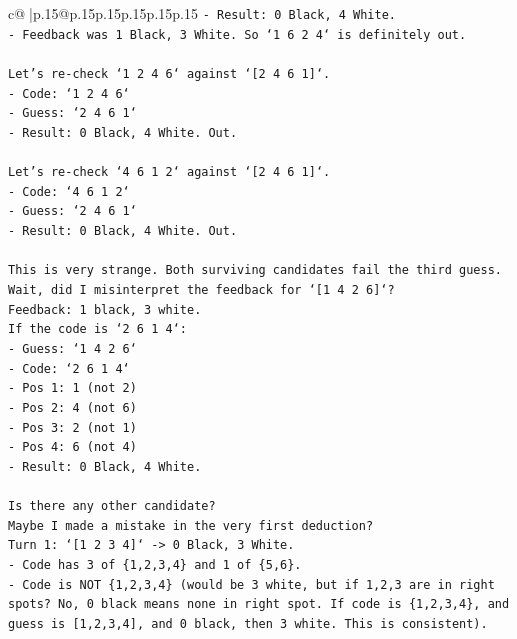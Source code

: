 \documentclass{article}
\begin{document}
{\begin{supertabular}{c@{$\;$}|p{.15\linewidth}@{}p{.15\linewidth}p{.15\linewidth}p{.15\linewidth}p{.15\linewidth}p{.15\linewidth}}
{{{\texttt{{-} Result: 0 Black, 4 White.} \\
\texttt{{-} Feedback was 1 Black, 3 White. So `1 6 2 4` is definitely out.} \\
\\ 
\texttt{Let's re{-}check `1 2 4 6` against `{[}2 4 6 1{]}`.} \\
\texttt{{-} Code: `1 2 4 6`} \\
\texttt{{-} Guess: `2 4 6 1`} \\
\texttt{{-} Result: 0 Black, 4 White. Out.} \\
\\ 
\texttt{Let's re{-}check `4 6 1 2` against `{[}2 4 6 1{]}`.} \\
\texttt{{-} Code: `4 6 1 2`} \\
\texttt{{-} Guess: `2 4 6 1`} \\
\texttt{{-} Result: 0 Black, 4 White. Out.} \\
\\ 
\texttt{This is very strange. Both surviving candidates fail the third guess.} \\
\texttt{Wait, did I misinterpret the feedback for `{[}1 4 2 6{]}`?} \\
\texttt{Feedback: 1 black, 3 white.} \\
\texttt{If the code is `2 6 1 4`:} \\
\texttt{{-} Guess: `1 4 2 6`} \\
\texttt{{-} Code: `2 6 1 4`} \\
\texttt{{-} Pos 1: 1 (not 2)} \\
\texttt{{-} Pos 2: 4 (not 6)} \\
\texttt{{-} Pos 3: 2 (not 1)} \\
\texttt{{-} Pos 4: 6 (not 4)} \\
\texttt{{-} Result: 0 Black, 4 White.} \\
\\ 
\texttt{Is there any other candidate?} \\
\texttt{Maybe I made a mistake in the very first deduction?} \\
\texttt{Turn 1: `{[}1 2 3 4{]}` {-}> 0 Black, 3 White.} \\
\texttt{{-} Code has 3 of \{1,2,3,4\} and 1 of \{5,6\}.} \\
\texttt{{-} Code is NOT \{1,2,3,4\} (would be 3 white, but if 1,2,3 are in right spots? No, 0 black means none in right spot. If code is \{1,2,3,4\}, and guess is {[}1,2,3,4{]}, and 0 black, then 3 white. This is consistent).} \\
}}}
\end{supertabular}}
\end{document}
